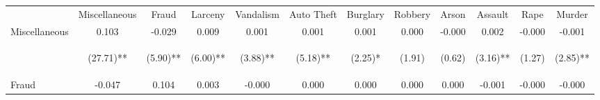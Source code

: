 \begin{tabular}{lccccccccccc}
\toprule \noalign{\smallskip} & Miscellaneous & Fraud & Larceny & Vandalism & Auto Theft & Burglary & Robbery & Arson & Assault & Rape & Murder\\
\noalign{\smallskip}\midrule \noalign{\smallskip}Miscellaneous & 0.103 & -0.029 & 0.009 & 0.001 & 0.001 & 0.001 & 0.000 & -0.000 & 0.002 & -0.000 & -0.001\\
 & \begin{footnotesize}(27.71)**\end{footnotesize} & \begin{footnotesize}(5.90)**\end{footnotesize} & \begin{footnotesize}(6.00)**\end{footnotesize} & \begin{footnotesize}(3.88)**\end{footnotesize} & \begin{footnotesize}(5.18)**\end{footnotesize} & \begin{footnotesize}(2.25)*\end{footnotesize} & \begin{footnotesize}(1.91)\end{footnotesize} & \begin{footnotesize}(0.62)\end{footnotesize} & \begin{footnotesize}(3.16)**\end{footnotesize} & \begin{footnotesize}(1.27)\end{footnotesize} & \begin{footnotesize}(2.85)**\end{footnotesize}\\
\noalign{\smallskip}Fraud & -0.047 & 0.104 & 0.003 & -0.000 & 0.000 & 0.000 & 0.000 & 0.000 & -0.001 & -0.000 & -0.000\\

\end{tabular}
